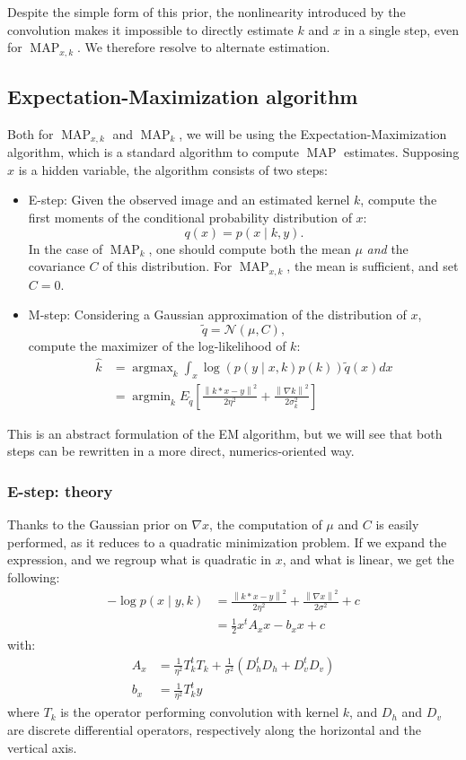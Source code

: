 \documentclass[english,a4paper]{article}
\theoremstyle{plain}
\theoremstyle{definition}
\theoremstyle{remark}
\DeclareMathOperator*{\argmin}{argmin}
\DeclareMathOperator*{\argmax}{argmax}
\DeclareMathOperator{\MAP}{MAP}
\newcommand{\norm}[1]{\left\lVert #1 \right\rVert}
\begin{document}
Despite the simple form of this prior, the nonlinearity introduced by the convolution makes it impossible to directly estimate $k$ and $x$ in a single step, even for $\MAP_{x,k}$. We therefore resolve to alternate estimation.


\subsection{Expectation-Maximization algorithm}
Both for $\MAP_{x,k}$ and $\MAP_k$, we will be using the Expectation-Maximization algorithm, which is a standard algorithm to compute $\MAP$ estimates.
Supposing $x$ is a hidden variable, the algorithm consists of two steps:
\begin{itemize}
	\item E-step:
	Given the observed image and an estimated kernel $k$, compute the first moments of the conditional probability distribution of $x$:
	\begin{equation}\label{eq:q}
	q(x) = p(x \mid k,y) .
	\end{equation}
	In the case of $\MAP_k$, one should compute both the mean $\mu$ \emph{and} the covariance $C$ of this distribution. For $\MAP_{x,k}$, the mean is sufficient, and set $C=0$.
	\item M-step:
	Considering a Gaussian approximation of the distribution of $x$,
	\[\tilde{q} = \mathcal{N}(\mu,C) ,\]
	compute the maximizer of the log-likelihood of $k$:
	\begin{align}\label{eq:M_step}
	\hat{k} 
	&= \argmax_k \int_x \log (p(y \mid x,k) p(k)) \tilde{q}(x) dx
	\\
	\label{eq:m_step_expectation}
	&= \argmin_k E_{\tilde{q}} \left[ \frac{\norm{k*x-y}^2}{2\eta^2} + \frac{\norm{\nabla k}^2}{2\sigma_k^2} \right]
	\end{align}	
\end{itemize}
This is an abstract formulation of the EM algorithm, but we will see that both steps can be rewritten in a more direct, numerics-oriented way.

\subsubsection{E-step: theory}
Thanks to the Gaussian prior on $\nabla x$, the computation of $\mu$ and $C$ is easily performed, as it reduces to a quadratic minimization problem.
If we expand the expression, and we regroup what is quadratic in $x$, and what is linear, we get the following:
\begin{align}\label{eq:e_step_quadratic}
-\log p(x \mid y,k) &= \frac{\norm{k*x-y}^2}{2\eta^2} + \frac{\norm{\nabla x}^2}{2\sigma^2} + c \nonumber
\\ 
&= \frac{1}{2}x^t A_x x - b_x x + c
\end{align}
with:
\begin{align*}
A_x &= \frac{1}{\eta^2} T_k^t T_k + \frac{1}{\sigma^2}(D_h^t D_h + D_v^t D_v)\\
b_x &= \frac{1}{\eta^2} T_k^t y
\end{align*}
where $T_k$ is the operator performing convolution with kernel $k$, and $D_h$ and $D_v$ are discrete differential operators, respectively along the horizontal and the vertical axis.
\end{document}
